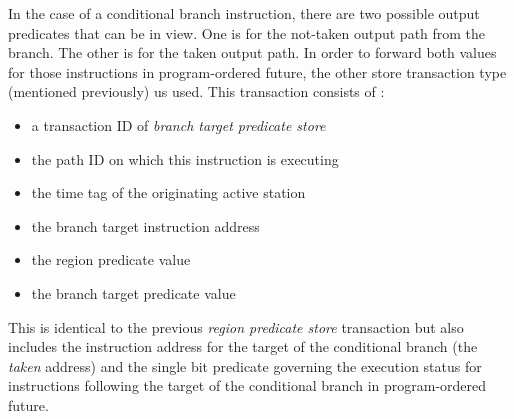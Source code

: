 \documentclass[10pt,dvips]{article}
\begin{document}
In the case of a conditional branch instruction,
there are two possible output predicates that can be in
view.  One is for the not-taken output path from the branch.
The other is for the taken output path.
In order to forward both values for those instructions
in program-ordered future, the other store transaction
type (mentioned previously) us used.
This transaction consists of :
%
\vspace{-0.05in}
\begin{itemize}
\vspace{-0.1in}
\item{a transaction ID of \textit{branch target predicate store}}
\vspace{-0.1in}
\item{the path ID on which this instruction is executing}
\vspace{-0.1in}
\item{the time tag of the originating active station}
\vspace{-0.1in}
\item{the branch target instruction address}
\vspace{-0.1in}
\item{the region predicate value}
\vspace{-0.1in}
\item{the branch target predicate value}
\vspace{-0.1in}
\end{itemize}   
%
This is identical to the previous \textit{region predicate store}
transaction but also includes the instruction address
for the target of the conditional branch (the \textit{taken} address)
and the single bit predicate
governing the execution status for instructions
following the target of the conditional branch in program-ordered
future.
\end{document}
